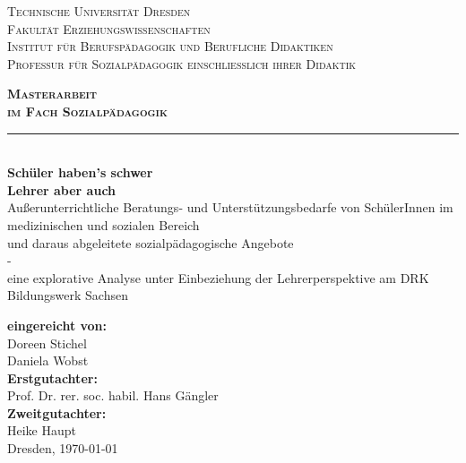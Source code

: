 \begin{titlepage}
\begin{center}
\normalsize
\scshape
Technische Universität Dresden\\
\normalsize
\upshape
Fakultät Erziehungswissenschaften\\
Institut für Berufspädagogik und Berufliche Didaktiken\\
Professur für Sozialpädagogik einschließlich ihrer Didaktik\\[2,0cm]
\end{center}

\begin{center}
\Huge
\scshape
\bfseries
Masterarbeit\\[0,5cm]
\normalsize
\mdseries
im Fach Sozialpädagogik\\
\noindent\rule{\textwidth}{1pt}\\[1cm]
\normalsize
\mdseries
\textbf{Schüler haben's schwer}\\
\textbf{Lehrer aber auch}\\[0,5cm]
\normalsize
\mdseries
Außerunterrichtliche Beratungs- und Unterstützungsbedarfe von SchülerInnen im medizinischen und sozialen Bereich\\ und daraus abgeleitete sozialpädagogische Angebote\\
-\\
eine explorative Analyse unter Einbeziehung der Lehrerperspektive am DRK Bildungswerk Sachsen\\[2,0cm]
\end{center}

\begin{center}
\textbf{eingereicht von:}\\
Doreen Stichel\\
Daniela Wobst\\[1,0cm]

\textbf{Erstgutachter:}\\
Prof. Dr. rer. soc. habil. Hans Gängler\\[1,0cm]
\textbf{Zweitgutachter:} \\
Heike Haupt\\[1,0cm]

Dresden, \today
\end{center}

\end{titlepage}